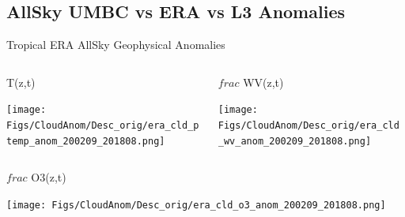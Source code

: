 \documentclass[10pt,t]{beamer}
\begin{document}
\subsection{AllSky UMBC vs ERA vs L3 Anomalies}
\begin{frame}{Tropical ERA AllSky Geophysical Anomalies}
\vspace{-0.35in}

\begin{columns}
\begin{column}{0.45\columnwidth}
\begin{block}{\footnotesize T(z,t)}
\vspace{-0.1in}
\begin{center}
\texttt{[image: Figs/CloudAnom/Desc\_orig/era\_cld\_ptemp\_anom\_200209\_201808.png]}
\end{center}
\end{block}
\end{column}

\begin{column}{0.45\columnwidth}
\begin{block}{\footnotesize $frac$ WV(z,t)}
\vspace{-0.1in}
\begin{center}
\texttt{[image: Figs/CloudAnom/Desc\_orig/era\_cld\_wv\_anom\_200209\_201808.png]}
\end{center}
\end{block}
\end{column}
\end{columns}

\vspace{-0.25in}

\begin{columns}
\begin{column}{0.45\columnwidth}
\begin{block}{\footnotesize $frac$ O3(z,t)}
\vspace{-0.1in}
\begin{center}
\texttt{[image: Figs/CloudAnom/Desc\_orig/era\_cld\_o3\_anom\_200209\_201808.png]}
\end{center}
\end{block}
\end{column}

\begin{column}{0.45\columnwidth}

\end{column}
\end{columns}
\end{frame}

\end{document}
